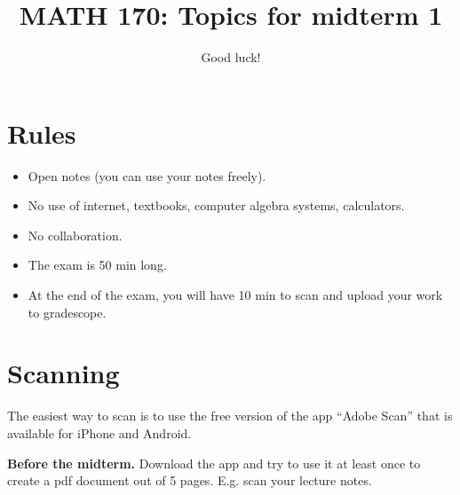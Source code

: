 \documentclass[12pt]{amsart}
\title{ MATH 170: Topics for midterm 1 }
\author{Good luck!}
\date{}
\begin{document}
\maketitle


\section*{Rules}

\begin{itemize}
    \item Open notes (you can use your notes freely).
    \item No use of internet, textbooks, computer algebra systems, calculators. 
    \item No collaboration.
    \item The exam is 50 min long.
    \item At the end of the exam, you will have 10 min to scan and upload your work to gradescope.
\end{itemize}


\section*{Scanning}

The easiest way to scan is to use the free version of the app ``Adobe Scan'' that is available for iPhone and Android.

\textbf{Before the midterm.} Download the app and try to use it at least once to create a pdf document out of 5 pages. E.g. scan your lecture notes.
\end{document}
